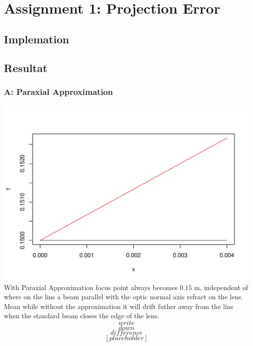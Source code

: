 \documentclass[12pt]{article}
\begin{document}
\section{Assignment 1: Projection Error}

\subsection{Implemation}

\subsection{Resultat}

\subsubsection{A: Paraxial Approximation}
\includegraphics[scale=0.6]{para_approx.pdf}
With Paraxial Approximation focus point always becomes $0.15$ m, independent 
of where on the lins a beam parallel with the optic normal axis refract on the lens.
Mean while without the approximation it will drift futher away from the lins 
when the standard beam closes the edge of the lens.
$$write$$ $$down$$ $$difference$$ $$[placeholder]$$
\end{document}
